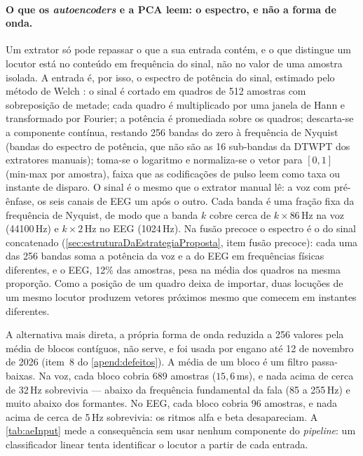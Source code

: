 \paragraph{O que os \textit{autoencoders} e a \ac{PCA} leem: o espectro, e não a forma de onda.}\label{sec:aeEntrada} Um extrator só pode repassar o que a sua entrada contém, e o que distingue um locutor está no conteúdo em frequência do sinal, não no valor de uma amostra isolada. A entrada é, por isso, o espectro de potência do sinal, estimado pelo método de Welch \cite{welch1967use}: o sinal é cortado em quadros de 512 amostras com sobreposição de metade; cada quadro é multiplicado por uma janela de Hann e transformado por Fourier; a potência é promediada sobre os quadros; descarta-se a componente contínua, restando 256 bandas do zero à frequência de Nyquist (bandas do espectro de potência, que não são as 16 sub-bandas da \ac{DTWPT} dos extratores manuais); toma-se o logaritmo e normaliza-se o vetor para $[0,1]$ (min-max por amostra), faixa que as codificações de pulso leem como taxa ou instante de disparo. O sinal é o mesmo que o extrator manual lê: a voz com pré-ênfase, os seis canais de \ac{EEG} um após o outro. Cada banda é uma fração fixa da frequência de Nyquist, de modo que a banda $k$ cobre cerca de $k \times 86$\,Hz na voz (44100\,Hz) e $k \times 2$\,Hz no \ac{EEG} (1024\,Hz). Na fusão precoce o espectro é o do sinal concatenado (\autoref{sec:estruturaDaEstrategiaProposta}, item fusão precoce): cada uma das 256 bandas soma a potência da voz e a do \ac{EEG} em frequências físicas diferentes, e o \ac{EEG}, 12\% das amostras, pesa na média dos quadros na mesma proporção. Como a posição de um quadro deixa de importar, duas locuções de um mesmo locutor produzem vetores próximos mesmo que comecem em instantes diferentes.

\par A alternativa mais direta, a própria forma de onda reduzida a 256 valores pela média de blocos contíguos, não serve, e foi usada por engano até 12 de novembro de 2026 (item~8 do \autoref{apend:defeitos}). A média de um bloco é um filtro passa-baixas. Na voz, cada bloco cobria 689 amostras ($15{,}6$\,ms), e nada acima de cerca de 32\,Hz sobrevivia --- abaixo da frequência fundamental da fala (85 a 255\,Hz) e muito abaixo dos formantes. No \ac{EEG}, cada bloco cobria 96 amostras, e nada acima de cerca de 5\,Hz sobrevivia: os ritmos alfa e beta desapareciam. A \autoref{tab:aeInput} mede a consequência sem usar nenhum componente do \textit{pipeline}: um classificador linear tenta identificar o locutor a partir de cada entrada.

